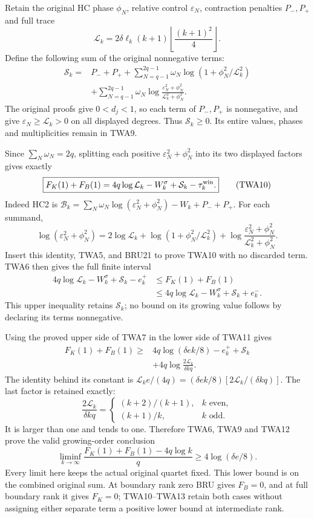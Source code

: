 Retain the original HC phase $\phi_N$, relative control
$\varepsilon_N$, contraction penalties $P_-,P_+$ and full trace
\[
\mathcal L_k=2\delta\ell_k(k+1)
                  \left\lfloor\frac{(k+1)^2}{4}\right\rfloor.
\]
Define the following sum of the original nonnegative terms:
\[
\begin{aligned}
\mathcal S_k={}&P_-+P_+
 +\sum_{N=q-1}^{2q-1}\omega_N
                   \log(1+\phi_N^2/\mathcal L_k^2)\\
&+\sum_{N=q-1}^{2q-1}\omega_N
       \log\frac{\varepsilon_N^2+\phi_N^2}
                    {\mathcal L_k^2+\phi_N^2}.
\end{aligned}\tag{TWA9}
\]
The original proofs give $0<d_j<1$, so each term of $P_-,P_+$
is nonnegative, and give $\varepsilon_N\ge\mathcal L_k>0$ on all
displayed degrees. Thus $\mathcal S_k\ge0$. Its entire values,
phases and multiplicities remain in TWA9.

Since $\sum_N\omega_N=2q$, splitting each positive
$\varepsilon_N^2+\phi_N^2$ into its two displayed factors gives
exactly
\[
\boxed{F_K(1)+F_B(1)
 =4q\log\mathcal L_k-W_k^\sigma
                      +\mathcal S_k-\tau_k^{\rm win}.}
\tag{TWA10}
\]
Indeed HC2 is $\mathcal B_k=\sum_N\omega_N
\log(\varepsilon_N^2+\phi_N^2)-W_k+P_-+P_+$.
For each summand,
\[
\log(\varepsilon_N^2+\phi_N^2)
=2\log\mathcal L_k+\log(1+\phi_N^2/\mathcal L_k^2)
 +\log\frac{\varepsilon_N^2+\phi_N^2}
                   {\mathcal L_k^2+\phi_N^2}.
\]
Insert this identity, TWA5, and BRU21 to prove TWA10 with no
discarded term. TWA6 then gives the full finite interval
\[
\begin{aligned}
4q\log\mathcal L_k-W_k^\sigma+\mathcal S_k-e_k^+
&\le F_K(1)+F_B(1)\\
&\le4q\log\mathcal L_k-W_k^\sigma+\mathcal S_k+e_k^-.
\end{aligned}\tag{TWA11}
\]
This upper inequality retains $\mathcal S_k$; no bound on its
growing value follows by declaring its terms nonnegative.

Using the proved upper side of TWA7 in the lower side of TWA11 gives
\[
\begin{aligned}
F_K(1)+F_B(1)\ge{}&4q\log(\delta e k/8)-e_k^++\mathcal S_k\\
&+4q\log\frac{2\mathcal L_k}{\delta kq}.
\end{aligned}\tag{TWA12}
\]
The identity behind its constant is
$\mathcal L_k e/(4q)=(\delta e k/8)
[2\mathcal L_k/(\delta kq)]$. The last factor is retained exactly:
\[
\frac{2\mathcal L_k}{\delta kq}
=\begin{cases}(k+2)/(k+1),&k\text{ even},\\
(k+1)/k,&k\text{ odd}.
\end{cases}
\]
It is larger than one and tends to one. Therefore TWA6, TWA9 and
TWA12 prove the valid growing-order conclusion
\[
\boxed{\liminf_{k\to\infty}
\frac{F_K(1)+F_B(1)-4q\log k}{q}
\ge4\log(\delta e/8).}\tag{TWA13}
\]
Every limit here keeps the actual original quartet fixed. This
lower bound is on the combined original sum. At boundary rank zero
BRU gives $F_B=0$, and at full boundary rank it gives $F_K=0$;
TWA10--TWA13 retain both cases without assigning either separate
term a positive lower bound at intermediate rank.

